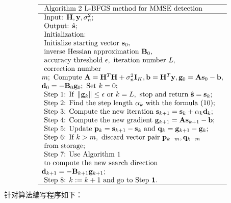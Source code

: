 \documentclass[twocolumn]{ctexart}
\begin{document}
\[\begin{array}{l}
\hline \text { Algorithm } 2 \text { L-BFGS method for MMSE detection } \\
\hline \text { Input: } \mathbf{H}, \mathbf{y}, \sigma_{n}^{2} ; \\
\text { Output: } \hat{\mathbf{s}} ; \\
\text { Initialization: } \\
\text { Initialize starting vector } \mathbf{s}_{0}, \\ 
\text { inverse Hessian approximation } \mathbf{B}_{0}, \\
\text { accuracy threshold } \epsilon, \text { iteration number } L,\\ \text { correction number } \\
m ; \text { Compute } \mathbf{A}=\mathbf{H}^{T} \mathbf{H}+\sigma_{n}^{2} \mathbf{I}_{K}, \mathbf{b}=\mathbf{H}^{T} \mathbf{y}, \mathbf{g}_{0}=\mathbf{A s}_{0}-\mathbf{b}, \\
\mathbf{d}_{0}=-\mathbf{B}_{0} \mathbf{g}_{0} ; \text { Set } k=0 ; \\
\text { Step 1: If }\left\|\mathbf{g}_{k}\right\| \leq \epsilon \text { or } k=L, \text { stop and return } \hat{\mathbf{s}}=\mathbf{s}_{k} ; \\
\text { Step 2: Find the step length } \alpha_{k} \text { with the formula (10); } \\
\text { Step 3: Compute the new iteration } \mathbf{s}_{k+1}=\mathbf{s}_{k}+\alpha_{k} \mathbf{d}_{k} ; \\
\text { Step 4: Compute the new gradient } \mathbf{g}_{k+1}=\mathbf{A s}_{k+1}-\mathbf{b} ; \\
\text { Step 5: Update } \mathbf{p}_{k}=\mathbf{s}_{k+1}-\mathbf{s}_{k} \text { and } \mathbf{q}_{k}=\mathbf{g}_{k+1}-\mathbf{g}_{k} ; \\
\text { Step 6: If } k>m, \text { discard vector pair } \mathbf{p}_{k-m}, \mathbf{q}_{k-m} \\ \text  { from storage; } \\
\text { Step 7: Use Algorithm } 1 \\ \text { to compute the new search direction } \\
\mathbf{d}_{k+1}=-\mathbf{B}_{k+1} \mathbf{g}_{k+1} ; \\
\text { Step 8: } k:=k+1 \text { and go to Step } \mathbf{1 .} \\
\hline
\end{array}\]
\quad 针对算法编写程序如下：\\
\end{document}
